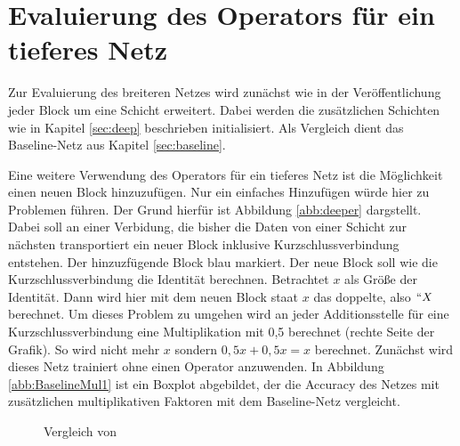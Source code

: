 \color{black}
\section{Evaluierung des Operators für ein tieferes Netz}
Zur Evaluierung des breiteren Netzes wird zunächst wie in der Veröffentlichung jeder Block um eine Schicht erweitert. Dabei werden die zusätzlichen Schichten wie in Kapitel \ref{sec:deep} beschrieben initialisiert. Als Vergleich dient das Baseline-Netz aus Kapitel \ref{sec:baseline}.


Eine weitere Verwendung des Operators für ein tieferes Netz ist die Möglichkeit einen neuen Block hinzuzufügen. Nur ein einfaches Hinzufügen würde hier zu Problemen führen. Der Grund hierfür ist Abbildung \ref{abb:deeper} dargstellt. Dabei soll an einer Verbidung, die bisher die Daten von einer Schicht zur nächsten transportiert ein neuer Block inklusive Kurzschlussverbindung entstehen. Der hinzuzfügende Block blau  markiert. Der neue Block soll wie die Kurzschlussverbindung die Identität berechnen. Betrachtet $x$ als Größe der Identität. Dann wird hier mit dem neuen Block staat $x$ das doppelte, also $``X$ berechnet. Um dieses Problem zu umgehen wird an jeder Additionsstelle für eine Kurzschlussverbindung eine Multiplikation mit 0,5 berechnet (rechte Seite der Grafik). So wird nicht mehr $x$ sondern $0,5x +0,5x=x$ berechnet.
\color{blue1}
Zunächst wird dieses Netz trainiert ohne einen Operator anzuwenden. In Abbildung \ref{abb:BaselineMul1} ist ein Boxplot abgebildet, der die Accuracy des Netzes mit zusätzlichen multiplikativen Faktoren mit dem Baseline-Netz vergleicht.

 \begin{figure}
     \centering
     \hfill
     \caption{Vergleich von }
     \label{abb:BaselineMul}
\end{figure}


